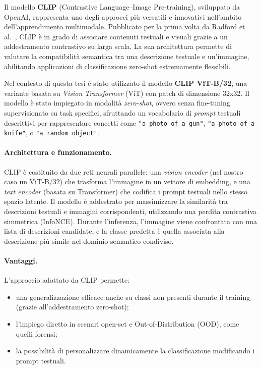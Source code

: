 Il modello \textbf{CLIP} (Contrastive Language–Image Pre-training), sviluppato da OpenAI, rappresenta uno degli approcci più versatili e innovativi nell’ambito dell’apprendimento multimodale. Pubblicato per la prima volta da Radford et al.~\cite{radford2021learning}, CLIP è in grado di associare contenuti testuali e visuali grazie a un addestramento contrastivo su larga scala. La sua architettura permette di valutare la compatibilità semantica tra una descrizione testuale e un’immagine, abilitando applicazioni di classificazione zero-shot estremamente flessibili.

Nel contesto di questa tesi è stato utilizzato il modello \textbf{CLIP ViT-B/32}, una variante basata su \textit{Vision Transformer} (ViT) con patch di dimensione 32x32. Il modello è stato impiegato in modalità \textit{zero-shot}, ovvero senza fine-tuning supervisionato su task specifici, sfruttando un vocabolario di \textit{prompt} testuali descrittivi per rappresentare concetti come \texttt{"a photo of a gun"}, \texttt{"a photo of a knife"}, o \texttt{"a random object"}.

\paragraph{Architettura e funzionamento.} CLIP è costituito da due reti neurali parallele: una \textit{vision encoder} (nel nostro caso un ViT-B/32) che trasforma l’immagine in un vettore di embedding, e una \textit{text encoder} (basata su Transformer) che codifica i prompt testuali nello stesso spazio latente. Il modello è addestrato per massimizzare la similarità tra descrizioni testuali e immagini corrispondenti, utilizzando una perdita contrastiva simmetrica (InfoNCE). Durante l’inferenza, l’immagine viene confrontata con una lista di descrizioni candidate, e la classe predetta è quella associata alla descrizione più simile nel dominio semantico condiviso.

\paragraph{Vantaggi.} L’approccio adottato da CLIP permette:
\begin{itemize}
    \item una generalizzazione efficace anche su classi non presenti durante il training (grazie all’addestramento zero-shot);
    \item l’impiego diretto in scenari open-set e Out-of-Distribution (OOD), come quelli forensi;
    \item la possibilità di personalizzare dinamicamente la classificazione modificando i prompt testuali.
\end{itemize}

